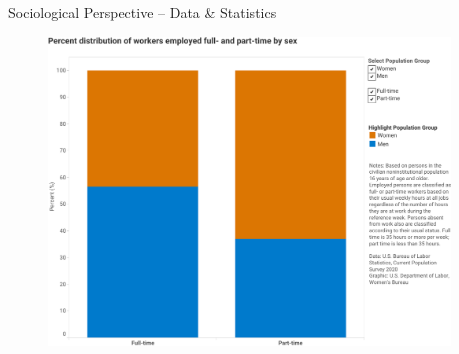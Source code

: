 \documentclass[usenames,dvipsnames]{beamer}
\begin{document}
    
    \begin{frame}{Sociological Perspective -- Data \& Statistics}
        \begin{figure}
            \begin{columns}
                \begin{column}{0.7\linewidth}
                    \vspace{\medskipamount}
                    \centering
                    \includegraphics[width=\textwidth]{figures/dol_full-_and_part-time_workers_by_sex.pdf}
                \end{column}
                \begin{column}{.275\linewidth}
                \end{column}
            \end{columns}
        \end{figure}
    \end{frame}
    
\end{document}
